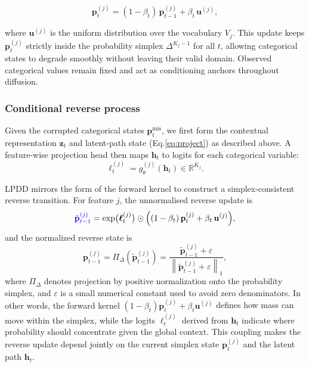 \documentclass[times, review, 10pt]{elsarticle}
\newcommand{\DIFaddbegin}{\begingroup\color{blue}}
\newcommand{\DIFaddend}{\endgroup}
\begin{document}
\[
\mathbf{p}_{t}^{(j)}
= (1-\beta_t)\,\mathbf{p}_{t-1}^{(j)} + \beta_t\,\mathbf{u}^{(j)},
\]

where $\mathbf{u}^{(j)}$ is the uniform distribution over the vocabulary
$V_j$. This update keeps $\mathbf{p}_{t}^{(j)}$ strictly inside the
probability simplex $\Delta^{K_j-1}$ for all $t$, allowing categorical states
to degrade smoothly without leaving their valid domain. Observed categorical
values remain fixed and act as conditioning anchors throughout diffusion.


\subsubsection{Conditional reverse process}

Given the corrupted categorical states $\mathbf{p}_t^{\mathrm{mis}}$, we first
form the contextual representation $\mathbf{z}_t$ and latent-path state
\DIFaddbegin
(Eq.\ref{eq:project}) as described
\DIFaddend
above. A feature-wise projection head then maps $\mathbf{h}_t$ to logits for
each categorical variable:
\begin{equation}
\boldsymbol{\ell}_t^{(j)} = g_\theta^{(j)}(\mathbf{h}_t)
\in \mathbb{R}^{K_j}.
\label{eq:project10}
\end{equation}

LPDD mirrors the form of the forward kernel to construct a
\DIFaddbegin
simplex-consistent reverse transition. For feature $j$, the unnormalised
reverse update is
\DIFaddend
\begin{equation}
\DIFaddbegin
\tilde{\mathbf{p}}_{t-1}^{(j)} =
\DIFaddend
\exp\!\big(\boldsymbol{\ell}_t^{(j)}\big)
\odot
\Big((1-\beta_t)\,\mathbf{p}_t^{(j)} + \beta_t\,\mathbf{u}^{(j)}\Big),
\DIFaddbegin
\label{eq:lpdd_unnormalized}
\DIFaddend
\end{equation}
\DIFaddbegin
and the normalized reverse state is
\begin{equation}
\mathbf{p}_{t-1}^{(j)}
=
\Pi_{\Delta}\!\left(\tilde{\mathbf{p}}_{t-1}^{(j)}\right)
=
\frac{\tilde{\mathbf{p}}_{t-1}^{(j)}+\varepsilon}
{\left\|\tilde{\mathbf{p}}_{t-1}^{(j)}+\varepsilon\right\|_1},
\label{eq:lpdd_reverse}
\end{equation}
where $\Pi_{\Delta}$ denotes projection by positive normalization onto the
probability simplex, and $\varepsilon$ is a small numerical constant used to
avoid zero denominators. In other words, the forward kernel
\DIFaddend
\((1-\beta_t)\mathbf{p}_t^{(j)} + \beta_t\mathbf{u}^{(j)}\) defines how mass
can move within the simplex, while the logits $\boldsymbol{\ell}_t^{(j)}$
derived from $\mathbf{h}_t$ indicate where probability should
concentrate given the global context. This coupling makes the reverse update
depend jointly on the current simplex state $\mathbf{p}_t^{(j)}$ and the
latent path $\mathbf{h}_t$.
\end{document}
